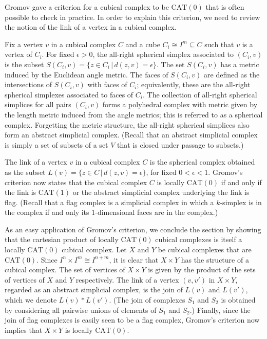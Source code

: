 \documentclass[a4paper,11pt]{article}
\newcommand{\CAT}{\textrm{CAT}}
\begin{document}
Gromov gave a criterion for a cubical complex to be $\CAT(0)$ that is often possible to check in practice.
In order to explain this criterion, we need to review the notion of the link of a vertex in a cubical complex.

Fix a vertex $v$ in a cubical complex $C$ and a cube $C_i \cong I^m \subseteq C$ such that $v$ is a vertex of $C_i$.
For fixed $\epsilon > 0$, the all-right spherical simplex associated to $(C_i,v)$ is the subset $S(C_i,v) = \{z \in C_i \, | \, d(z,v) = \epsilon\}$.
The set $S(C_i,v)$ has a metric induced by the Euclidean angle metric.
The faces of $S(C_i,v)$ are defined as the intersections of $S(C_i,v)$ with faces of $C_i$; equivalently, these are the all-right spherical simplexes associated to faces of $C_i$.
The collection of all-right spherical simplices for all pairs $(C_i, v)$ forms a polyhedral complex with metric given by the length metric induced from the angle metrics; this is referred to as a spherical complex.
Forgetting the metric structure, the all-right spherical simplices also form an abstract simplicial complex. (Recall that an abstract simplicial complex is simply a set of subsets of a set $V$ that is closed under passage to subsets.)

The link of a vertex $v$ in a cubical complex $C$ is the spherical complex obtained as the subset $L(v) = \{z \in C \, | \, d(z,v) = \epsilon\}$, for fixed $0 < \epsilon < 1$.
Gromov's criterion now states that the cubical complex $C$ is locally $\CAT(0)$ if and only if the link is $\CAT(1)$ or the abstract simplicial complex underlying the link is flag.
(Recall that a flag complex is a simplicial complex in which a $k$-simplex is in the complex if and only its $1$-dimensional faces are in the complex.)

As an easy application of Gromov's criterion, we conclude the section by showing that the cartesian product of locally $\CAT(0)$ cubical complexes is itself a locally $\CAT(0)$ cubical complex.
Let $X$ and $Y$ be cubical complexes that are $\CAT(0)$.
Since $I^n \times I^m \cong I^{n+m}$, it is clear that $X \times Y$ has the structure of a cubical complex.
The set of vertices of $X \times Y$ is given by the product of the sets of vertices of $X$ and $Y$ respectively.
The link of a vertex $(v,v')$ in $X \times Y$, regarded as an abstract simplicial complex, is the join of $L(v)$ and $L(v')$, which we denote $L(v) \ast L(v')$.
(The join of complexes $S_1$ and $S_2$ is obtained by considering all pairwise unions of elements of $S_1$ and $S_2$.)
Finally, since the join of flag complexes is easily seen to be a flag complex, Gromov's criterion now implies that $X \times Y$ is locally $\CAT(0)$.
\end{document}
